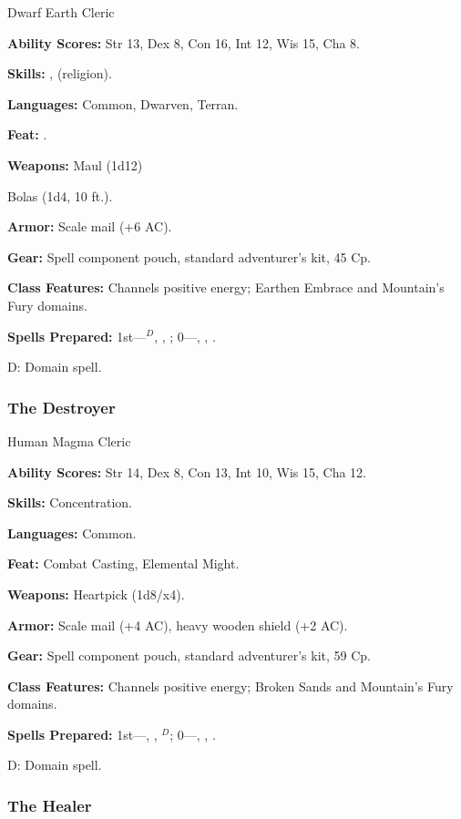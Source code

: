 Dwarf Earth Cleric

\textbf{Ability Scores:} Str 13, Dex 8, Con 16, Int 12, Wis 15, Cha 8.

\textbf{Skills:} ,  (religion).

\textbf{Languages:} Common, Dwarven, Terran.

\textbf{Feat:} .

\textbf{Weapons:} Maul (1d12)

Bolas (1d4, 10 ft.).

\textbf{Armor:} Scale mail (+6 AC).

\textbf{Gear:} Spell component pouch, standard adventurer's kit, 45 Cp.

\textbf{Class Features:} Channels positive energy; Earthen Embrace and Mountain's Fury domains.

\textbf{Spells Prepared:} 1st---$^D$, , ; 0---, , .

D: Domain spell.

\subsubsection{The Destroyer}

Human Magma Cleric

\textbf{Ability Scores:} Str 14, Dex 8, Con 13, Int 10, Wis 15, Cha 12.

\textbf{Skills:} Concentration.

\textbf{Languages:} Common.

\textbf{Feat:} Combat Casting, Elemental Might.

\textbf{Weapons:} Heartpick (1d8/x4).

\textbf{Armor:} Scale mail (+4 AC), heavy wooden shield (+2 AC).

\textbf{Gear:} Spell component pouch, standard adventurer's kit, 59 Cp.

\textbf{Class Features:} Channels positive energy; Broken Sands and Mountain's Fury domains.

\textbf{Spells Prepared:} 1st---, , $^{D}$; 0---, , .

D: Domain spell.

\subsubsection{The Healer}

